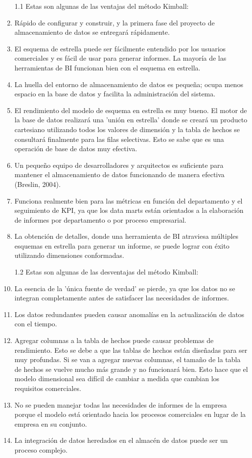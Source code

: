 \documentclass[twoside,twocolumn]{article}
\begin{document}
\begin{enumerate}
\begin{enumerate}
\item[1.1] Estas son algunas de las ventajas del método Kimball: \\ 
\item Rápido de configurar y construir, y la primera fase del proyecto de almacenamiento de datos se entregará rápidamente.
\item El esquema de estrella puede ser fácilmente entendido por los usuarios comerciales y es fácil de usar para generar informes. La mayoría de las herramientas de BI funcionan bien con el esquema en estrella.
\item La huella del entorno de almacenamiento de datos es pequeña; ocupa menos espacio en la base de datos y facilita la administración del sistema.
\item El rendimiento del modelo de esquema en estrella es muy bueno. El motor de la base de datos realizará una 'unión en estrella' donde se creará un producto cartesiano utilizando todos los valores de dimensión y la tabla de hechos se consultará finalmente para las filas selectivas. Esto se sabe que es una operación de base de datos muy efectiva.
\item Un pequeño equipo de desarrolladores y arquitectos es suficiente para mantener el almacenamiento de datos funcionando de manera efectiva (Breslin, 2004).
\item Funciona realmente bien para las métricas en función del departamento y el seguimiento de KPI, ya que los data marts están orientados a la elaboración de informes por departamento o por proceso empresarial.
\item La obtención de detalles, donde una herramienta de BI atraviesa múltiples esquemas en estrella para generar un informe, se puede lograr con éxito utilizando dimensiones conformadas.


\item[1.2] Estas son algunas de las desventajas del método Kimball: \\ 
\item La esencia de la 'única fuente de verdad' se pierde, ya que los datos no se integran completamente antes de satisfacer las necesidades de informes.
\item Los datos redundantes pueden causar anomalías en la actualización de datos con el tiempo.
\item Agregar columnas a la tabla de hechos puede causar problemas de rendimiento. Esto se debe a que las tablas de hechos están diseñadas para ser muy profundas. Si se van a agregar nuevas columnas, el tamaño de la tabla de hechos se vuelve mucho más grande y no funcionará bien. Esto hace que el modelo dimensional sea difícil de cambiar a medida que cambian los requisitos comerciales.
\item No se pueden manejar todas las necesidades de informes de la empresa porque el modelo está orientado hacia los procesos comerciales en lugar de la empresa en su conjunto.
\item La integración de datos heredados en el almacén de datos puede ser un proceso complejo.





\end{enumerate}
\end{enumerate}
\end{document}
